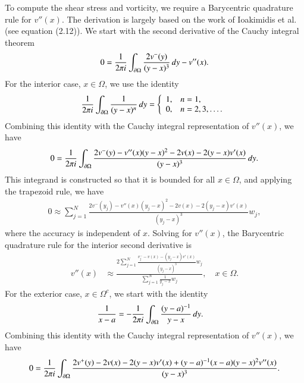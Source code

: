 \documentclass[preprint, 10pt]{elsarticle}
\begin{document}
To compute the shear stress and vorticity, we require a Barycentric
quadrature rule for $v''(x)$.  The derivation is largely based on the
work of Ioakimidis et al.~\cite{ioa-pap-per1991} (see equation (2.12)).
We start with the second derivative of the Cauchy integral theorem
\begin{align}
  0 = \frac{1}{2\pi i} \int_{{\partial}\Omega} 
      \frac{2v^{-}(y)}{(y-x)^3}\,dy - v''(x).
\end{align}
For the interior case, $x \in \Omega$, we use the identity
\begin{align}
  \frac{1}{2\pi i}\int_{{\partial}\Omega} \frac{1}{(y-x)^n}\, dy = 
  \left\{
    \begin{array}{ll}
      1, & n = 1, \\
      0, & n = 2,3,\ldots. \\
    \end{array}
  \right.
\end{align}
Combining this identity with the Cauchy integral representation of
$v''(x)$, we have
\begin{align}
  0 = \frac{1}{2\pi i} \int_{{\partial}\Omega} 
      \frac{2v^{-}(y) - v''(x)(y-x)^2 - 2v(x) - 2(y-x)v'(x)}
      {(y-x)^3}\, dy.
\end{align}
This integrand is constructed so that it is bounded for all $x \in
\Omega$, and applying the trapezoid rule, we have
\begin{align}
  0 \approx  \sum_{j=1}^{N} 
      \frac{2v^{-}(y_j) - v''(x)(y_j-x)^2 - 2v(x) - 2(y_j-x)v'(x)}
      {(y_j-x)^3} w_j,
\end{align}
where the accuracy is independent of $x$.  Solving for $v''(x)$, the
Barycentric quadrature rule for the interior second derivative is
\begin{align}
  v''(x) &\approx \frac{2\sum\limits_{j=1}^N 
    \frac{v^{-}_{j} - v(x) - (y_j-x)v'(x)}{(y_j-x)^3}w_j}
    {\sum\limits_{j=1}^N \frac{1}{y_j-x}w_j}, \quad x \in \Omega.
\end{align}
For the exterior case, $x \in \Omega^c$, we start with the identity
\begin{align}
\frac{1}{x-a} &= -\frac{1}{2\pi i}\int_{{\partial}\Omega} 
    \frac{(y-a)^{-1}}{y-x}\, dy. 
\end{align}
Combining this identity with the Cauchy integral representation of
$v''(x)$, we have
\begin{align}
  0 = \frac{1}{2\pi i} \int_{{\partial}\Omega} 
    \frac{2v^+(y) - 2v(x) - 2(y-x)v'(x) + (y-a)^{-1} (x-a) (y-x)^2 v''(x)}
    {(y-x)^3}.
\end{align}
\end{document}
